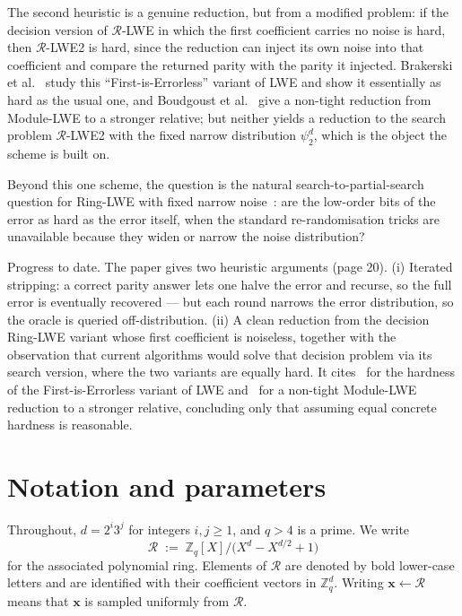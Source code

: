 \documentclass{aicr-conjecture}
\begin{document}
The second heuristic is a genuine reduction, but from a modified
problem: if the decision version of $\mathcal{R}$-LWE in which the
first coefficient carries no noise is hard, then $\mathcal{R}$-LWE2 is
hard, since the reduction can inject its own noise into that
coefficient and compare the returned parity with the parity it
injected. Brakerski et al.~\cite{BLP13} study this
``First-is-Errorless'' variant of LWE and show it essentially as hard
as the usual one, and Boudgoust et al.~\cite{BJRW21} give a non-tight
reduction from Module-LWE to a stronger relative; but neither yields a
reduction to the search problem $\mathcal{R}$-LWE2 with the fixed
narrow distribution $\psi_2^{d}$, which is the object the scheme is
built on.

Beyond this one scheme, the question is the natural
search-to-partial-search question for Ring-LWE with fixed narrow
noise~\cite{Reg09}: are the low-order bits of the error as hard as the
error itself, when the standard re-randomisation tricks are unavailable
because they widen or narrow the noise distribution?

Progress to date. The paper gives two heuristic arguments (page 20).
(i) Iterated stripping: a correct parity answer lets one halve the
error and recurse, so the full error is eventually recovered --- but
each round narrows the error distribution, so the oracle is queried
off-distribution. (ii) A clean reduction from the decision Ring-LWE
variant whose first coefficient is noiseless, together with the
observation that current algorithms would solve that decision problem
via its search version, where the two variants are equally hard. It
cites~\cite{BLP13} for the hardness of the First-is-Errorless variant
of LWE and~\cite{BJRW21} for a non-tight Module-LWE reduction to a
stronger relative, concluding only that assuming equal concrete
hardness is reasonable.

\section{Notation and parameters}\label{sec:notation}

Throughout, $d = 2^{i}3^{j}$ for integers $i,j \ge 1$, and $q > 4$ is a
prime. We write
\[
  \mathcal{R} \;:=\; \mathbb{Z}_q[X]/\bigl(X^{d} - X^{d/2} + 1\bigr)
\]
for the associated polynomial ring. Elements of $\mathcal{R}$ are
denoted by bold lower-case letters and are identified with their
coefficient vectors in $\mathbb{Z}_q^{d}$. Writing
$\mathbf{x} \leftarrow \mathcal{R}$ means that $\mathbf{x}$ is sampled
uniformly from $\mathcal{R}$.
\end{document}
